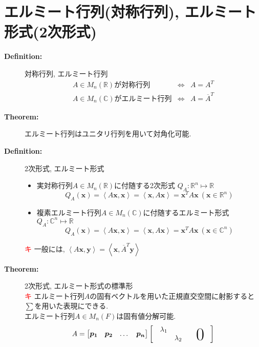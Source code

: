 \documentclass[dvipdfmx]{jsarticle}
\newcommand*{\point}{\textcircled{\textcolor{red}{\scriptsize キ}} }
\newcommand{\tlinner}[2]{%
    \left\langle #1, #2 \right\rangle%
}
\def\hsymb#1{\mbox{\strut\rlap{\smash{\Huge$#1$}}\quad}}
\begin{document}
\section{エルミート行列(対称行列), エルミート形式(2次形式)}
\begin{description}
    \item[\bf{Definition:}] 対称行列, エルミート行列
        \begin{eqnarray*}
            A \in M_n(\mathbb{R}) \text{が対称行列} &\Leftrightarrow& A = A^T  \\
            A \in M_n(\mathbb{C}) \text{がエルミート行列} &\Leftrightarrow& A = \overline{A}^T
        \end{eqnarray*}
    
    \item[\bf{Theorem:}] エルミート行列はユニタリ行列を用いて対角化可能.
    \item[\bf{Definition:}] 2次形式, エルミート形式 
        \begin{itemize}
            \item  実対称行列$A \in M_n(\mathbb{R})$に付随する2次形式 $Q_A : \mathbb{R}^n \mapsto \mathbb{R}$
                $$ Q_A(\bm{x}) = \tlinner{A \bm{x}}{\bm{x}} = \tlinner{\bm{x}}{A \bm{x}} = \bm{x}^T A \bm{x} \ (\bm{x} \in \mathbb{R}^n)$$
            \item 複素エルミート行列$A \in M_n(\mathbb{C})$に付随するエルミート形式 $Q_A : \mathbb{C}^n \mapsto \mathbb{R}$
                $$ Q_A(\bm{x}) = \tlinner{A \bm{x}}{\bm{x}} = \tlinner{\bm{x}}{A \bm{x}} = \bm{x}^T A \bm{x} \ (\bm{x} \in \mathbb{C}^n)$$
        \end{itemize}
        \point 一般には, $\tlinner{A \bm{x}}{\bm{y}} = \tlinner{\bm{x}}{ \overline{A}^T \bm{y}}$
    \item[\bf{Theorem:}] 2次形式, エルミート形式の標準形 \\
        \point エルミート行列$A$の固有ベクトルを用いた正規直交空間に射影すると$\sum$を用いた表現にできる. \\
        エルミート行列$A \in M_n(F)$は固有値分解可能.
            $$ A = 
            \begin{bmatrix}
                \bm{p_1} & \bm{p_2} & \dots & \bm{p_n}
            \end{bmatrix}
            \begin{bmatrix}
                & \lambda_1 &           &    &  & \\
                &          & \lambda_2 &     & \hsymb{0} &  \\

\end{bmatrix}$$
\end{description}
\end{document}
